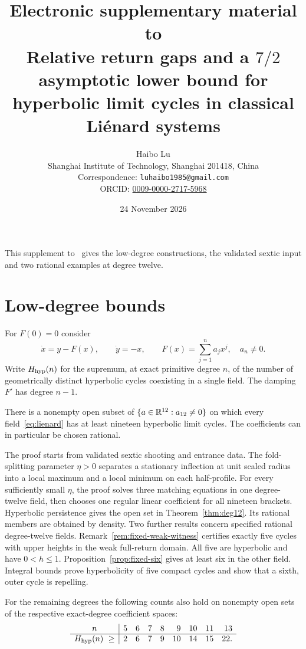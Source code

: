 \documentclass[11pt]{article}
\title{\large Electronic supplementary material to\\[4pt]
\Large Relative return gaps and a $7/2$ asymptotic lower bound for hyperbolic limit cycles in classical Li\'enard systems}
\author{Haibo Lu\\[2pt]
\small Shanghai Institute of Technology, Shanghai 201418, China\\
\small Correspondence: \nolinkurl{luhaibo1985@gmail.com}\\
\small ORCID: \href{https://orcid.org/0009-0000-2717-5968}{0009-0000-2717-5968}}
\date{24 November 2026}
\begin{document}
\maketitle
\noindent This supplement to~\cite{MainArticle} gives the low-degree
constructions, the validated sextic input and two rational examples
at degree twelve.

\section{Low-degree bounds}\label{sec:intro}
For $F(0)=0$ consider
\begin{equation}\label{eq:lienard}
 \dot x=y-F(x),\qquad \dot y=-x,\qquad
 F(x)=\sum_{j=1}^n a_jx^j,\quad a_n\ne0.
\end{equation}
Write $H_{\mathrm{hyp}}(n)$ for the supremum, at exact primitive degree $n$, of the number
of geometrically distinct hyperbolic cycles coexisting in a single field.
The damping $F'$ has degree $n-1$.

\begin{theorem}\label{thm:deg12}
There is a nonempty open subset of $\{a\in\mathbb{R}^{12}:a_{12}\ne0\}$ on which
every field~\eqref{eq:lienard} has at least nineteen hyperbolic limit cycles.
The coefficients can in particular be chosen rational.
\end{theorem}

The proof starts from validated sextic shooting and entrance data. The
fold-splitting parameter $\eta>0$ separates a stationary inflection at unit scaled radius
into a local maximum and a local minimum on each half-profile.
For every sufficiently small $\eta$, the proof solves three matching equations in one
degree-twelve field, then chooses one regular linear coefficient for
all nineteen brackets. Hyperbolic persistence gives the open set in
Theorem~\ref{thm:deg12}. Its rational members are obtained by density.
Two further results concern specified rational degree-twelve fields.
Remark~\ref{rem:fixed-weak-witness} certifies exactly five cycles with
upper heights in the weak full-return domain. All five are hyperbolic
and have $0<h\le1$. Proposition~\ref{prop:fixed-six} gives
at least six in the other field. Integral bounds prove hyperbolicity of five compact cycles
and show that a sixth, outer cycle is repelling.

\begin{proposition}\label{prop:low-deg}
For the remaining degrees the following counts also hold on nonempty open
sets of the respective exact-degree coefficient spaces:
\[
\begin{array}{c|rrrrrrrr}
 n &5&6&7&8&9&10&11&13\\ \hline
 H_{\mathrm{hyp}}(n)\ \ge &2&6&7&9&10&14&15&22 .
\end{array}
\]
\end{proposition}
\end{document}
